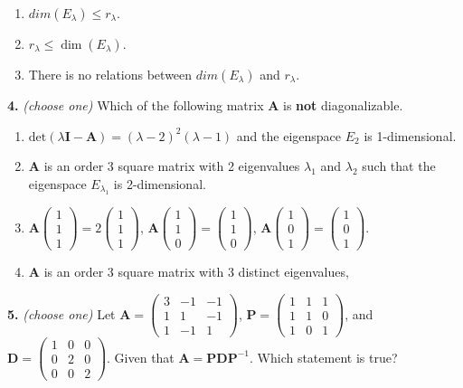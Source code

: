 \documentclass[10pt,a4paper]{article}
\begin{document}
\begin{enumerate}[label=(\Alph*)]
\item \(dim(E_\lambda)\leq r_\lambda\).
\item \(r_\lambda\leq \dim(E_\lambda)\).
\item There is no relations between \(dim(E_\lambda)\) and \(r_\lambda\).
\end{enumerate}
\smallskip
\textbf{4.} \textit{(choose one)} Which of the following matrix \(\mathbf{A}\) is \textbf{not} diagonalizable.

\begin{enumerate}[label=(\Alph*)]
\item \(\text{det}(\lambda\mathbf{I}-\mathbf{A})=(\lambda-2)^2(\lambda-1)\) and the eigenspace \(E_2\) is 1-dimensional.
\item \(\mathbf{A}\) is an order 3 square matrix with 2 eigenvalues \(\lambda_1\) and \(\lambda_2\) such that the eigenspace \(E_{\lambda_1}\) is 2-dimensional.
\item \(\mathbf{A}\begin{pmatrix}1\\1\\1\end{pmatrix}=2\begin{pmatrix}1\\1\\1\end{pmatrix}\), \(\mathbf{A}\begin{pmatrix}1\\1\\0\end{pmatrix}=\begin{pmatrix}1\\1\\0\end{pmatrix}\), \(\mathbf{A}\begin{pmatrix}1\\0\\1\end{pmatrix}=\begin{pmatrix}1\\0\\1\end{pmatrix}\).
\item \(\mathbf{A}\) is an order 3 square matrix with 3 distinct eigenvalues,
\end{enumerate}
\smallskip
\textbf{5.} \textit{(choose one)} Let \(\mathbf{A}=\begin{pmatrix}3&-1&-1\\1&1&-1\\1&-1&1 \end{pmatrix}\), \(\mathbf{P}=\begin{pmatrix}1&1&1\\1&1&0\\1&0&1 \end{pmatrix}\), and \(\mathbf{D}=\begin{pmatrix}1&0&0\\0&2&0\\0&0&2\end{pmatrix}\). Given that \(\mathbf{A}=\mathbf{PDP}^{-1}\). Which statement is true?
\end{document}
